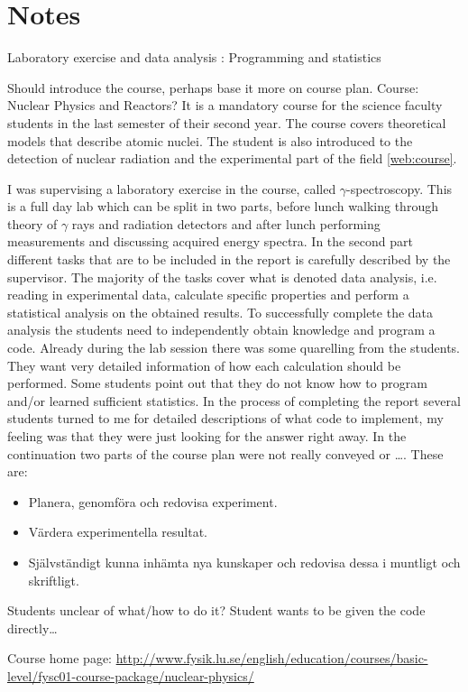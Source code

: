 \documentclass[]{article}
\begin{document}
\section{Notes}
Laboratory exercise and data analysis : Programming and statistics

Should introduce the course, perhaps base it more on course plan.
Course: Nuclear Physics and Reactors?
It is a mandatory course for the science faculty students in the last semester of their second year.
The course covers theoretical models that describe atomic nuclei.
The student is also introduced to the detection of nuclear radiation and the experimental part of the field \ref{web:course}.

I was supervising a laboratory exercise in the course, called $\gamma$-spectroscopy.
This is a full day lab which can be split in two parts, before lunch walking through theory of $\gamma$ rays and radiation detectors and after lunch performing measurements and discussing acquired energy spectra.
In the second part different tasks that are to be included in the report is carefully described by the supervisor.
The majority of the tasks cover what is denoted data analysis, i.e. reading in experimental data, calculate specific properties and perform a statistical analysis on the obtained results.
To successfully complete the data analysis the students need to independently obtain knowledge and program a code.
Already during the lab session there was some quarelling from the students.
They want very detailed information of how each calculation should be performed.
Some students point out that they do not know how to program and/or learned sufficient statistics.
In the process of completing the report several students turned to me for detailed descriptions of what code to implement, my feeling was that they were just looking for the answer right away.
In the continuation two parts of the course plan were not really conveyed or \dots. These are:
\begin{itemize}
  \item Planera, genomföra och redovisa experiment.
  \item Värdera experimentella resultat.
  \item Självständigt kunna inhämta nya kunskaper och redovisa dessa i muntligt och
    skriftligt.
\end{itemize}


Students unclear of what/how to do it? Student wants to be given the code directly\dots

Course home page: \url{http://www.fysik.lu.se/english/education/courses/basic-level/fysc01-course-package/nuclear-physics/}
\end{document}
